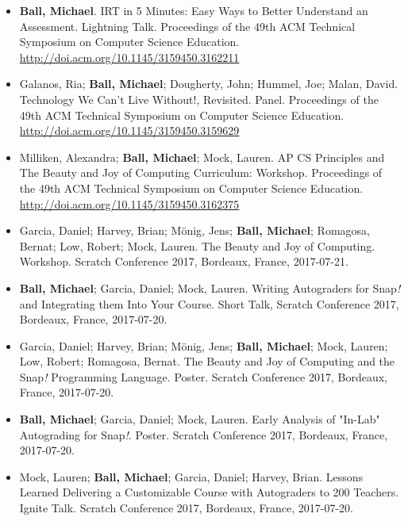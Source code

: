 \begin{itemize}
    \item{\textbf{Ball, Michael}. IRT in 5 Minutes: Easy Ways to Better Understand an Assessment. Lightning Talk. Proceedings of the 49th ACM Technical Symposium on Computer Science Education.} \href{http://doi.acm.org/10.1145/3159450.3162211}{http://doi.acm.org/10.1145/3159450.3162211}

    \item{Galanos, Ria; \textbf{Ball, Michael}; Dougherty, John; Hummel, Joe; Malan, David. Technology We Can't Live Without!, Revisited. Panel. Proceedings of the 49th ACM Technical Symposium on Computer Science Education.} \href{http://doi.acm.org/10.1145/3159450.3159629}{http://doi.acm.org/10.1145/3159450.3159629}

    \item{Milliken, Alexandra; \textbf{Ball, Michael}; Mock, Lauren. AP CS Principles and The Beauty and Joy of Computing Curriculum: Workshop. Proceedings of the 49th ACM Technical Symposium on Computer Science Education.} \href{http://doi.acm.org/10.1145/3159450.3162375}{http://doi.acm.org/10.1145/3159450.3162375}

    
    \item{Garcia, Daniel; Harvey, Brian; Mönig, Jens; \textbf{Ball, Michael}; Romagosa, Bernat; Low, Robert; Mock, Lauren. The Beauty and Joy of Computing. Workshop. Scratch Conference 2017, Bordeaux, France, 2017-07-21.}

    \item{\textbf{Ball, Michael}; Garcia, Daniel; Mock, Lauren. Writing Autograders for Snap\textit{!} and Integrating them Into Your Course. Short Talk, Scratch Conference 2017, Bordeaux, France, 2017-07-20.}

    \item{Garcia, Daniel; Harvey, Brian; Mönig, Jens; \textbf{Ball, Michael}; Mock, Lauren; Low, Robert; Romagosa, Bernat. The Beauty and Joy of Computing and the Snap\textit{!} Programming Language. Poster. Scratch Conference 2017, Bordeaux, France, 2017-07-20.}

    \item{\textbf{Ball, Michael}; Garcia, Daniel; Mock, Lauren. Early Analysis of "In-Lab" Autograding for Snap\textit{!}. Poster. Scratch Conference 2017, Bordeaux, France, 2017-07-20.}

    \item{Mock, Lauren; \textbf{Ball, Michael}; Garcia, Daniel; Harvey, Brian. Lessons Learned Delivering a Customizable Course with Autograders to 200 Teachers. Ignite Talk. Scratch Conference 2017, Bordeaux, France, 2017-07-20.}
    

\end{itemize}

